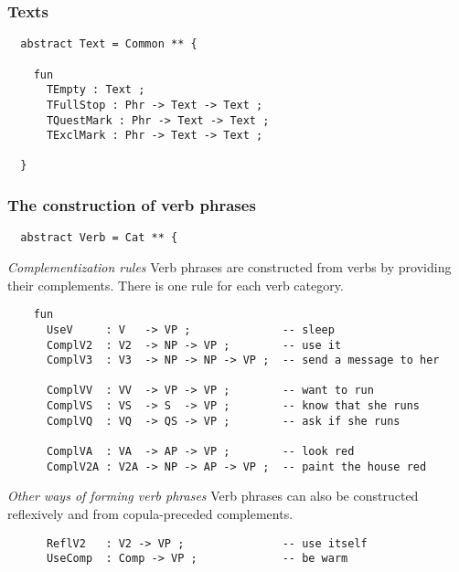 \documentclass[11pt,a4paper]{article}
\newcommand{\commOut}[1]{}
\newcommand{\subsubsubsection}[1]{\textit{#1}}
\begin{document}
\commOut{Produced by 
gfdoc - a rudimentary GF document generator.
(c) Aarne Ranta (\htmladdnormallink{aarne@cs.chalmers.se}{mailto:aarne@cs.chalmers.se}) 2002 under GNU GPL.}


\subsubsection{Texts}
\begin{verbatim}
  abstract Text = Common ** {
  
    fun
      TEmpty : Text ;
      TFullStop : Phr -> Text -> Text ;
      TQuestMark : Phr -> Text -> Text ;
      TExclMark : Phr -> Text -> Text ;
  
  }
\end{verbatim}

\commOut{Produced by 
gfdoc - a rudimentary GF document generator.
(c) Aarne Ranta (\htmladdnormallink{aarne@cs.chalmers.se}{mailto:aarne@cs.chalmers.se}) 2002 under GNU GPL.}


\subsubsection{The construction of verb phrases}
\begin{verbatim}
  abstract Verb = Cat ** {
\end{verbatim}

\subsubsubsection{Complementization rules}
Verb phrases are constructed from verbs by providing their
complements. There is one rule for each verb category.

\begin{verbatim}
    fun
      UseV     : V   -> VP ;              -- sleep
      ComplV2  : V2  -> NP -> VP ;        -- use it
      ComplV3  : V3  -> NP -> NP -> VP ;  -- send a message to her
  
      ComplVV  : VV  -> VP -> VP ;        -- want to run
      ComplVS  : VS  -> S  -> VP ;        -- know that she runs
      ComplVQ  : VQ  -> QS -> VP ;        -- ask if she runs
  
      ComplVA  : VA  -> AP -> VP ;        -- look red
      ComplV2A : V2A -> NP -> AP -> VP ;  -- paint the house red
\end{verbatim}

\subsubsubsection{Other ways of forming verb phrases}
Verb phrases can also be constructed reflexively and from
copula-preceded complements.

\begin{verbatim}
      ReflV2   : V2 -> VP ;               -- use itself
      UseComp  : Comp -> VP ;             -- be warm
\end{verbatim}
\end{document}
